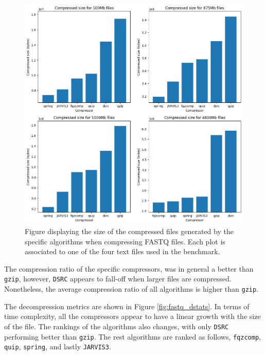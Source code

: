     \begin{figure}
        \centering
        \includegraphics[width=1\textwidth]{figs/fastq_comp_size.png}
        \caption[Figure displaying the size of the compressed files generated by the specific algorithms when compressing FASTQ files.] {Figure displaying the size of the compressed files generated by the specific algorithms when compressing FASTQ files. Each plot is associated to one of the four text files used in the benchmark.}
        \label{fig:fastq_comp_size}
    \end{figure}


    The compression ratio of the specific compressors, was in general a better than \texttt{gzip}, however, \texttt{DSRC} appears to fall-off when larger files are compressed. Nonetheless, the average compression ratio of all algorithms is higher than \texttt{gzip}.

    The decompression metrics are shown in Figure \ref{fig:fastq_dstats}. In terms of time complexity, all the compressors appear to have a linear growth with the size of the file. The rankings of the algorithms also changes, with only \texttt{DSRC} performing better than \texttt{gzip}. The rest algorithms are ranked as follows, \texttt{fqzcomp}, \texttt{quip}, \texttt{spring}, and lastly \texttt{JARVIS3}.

